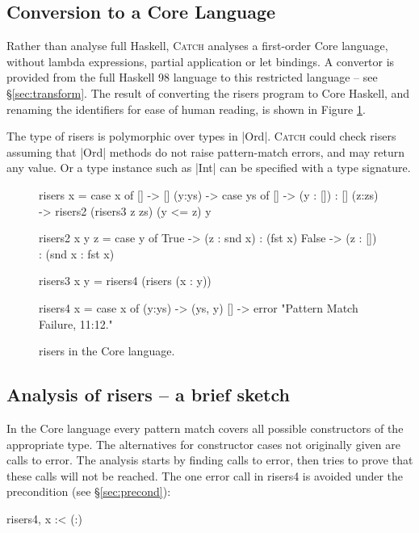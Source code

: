 \documentclass[preprint]{sigplanconf}
\newcommand{\C}[1]{\textsf{#1}}
\newcommand{\catch}{\textsc{Catch}}
\begin{document}
\subsection{Conversion to a Core Language}

Rather than analyse full Haskell, \catch{} analyses a first-order Core language, without lambda expressions, partial application or let bindings. A convertor is provided from the full Haskell 98 language to this restricted language -- see \S\ref{sec:transform}. The result of converting the \C{risers} program to Core Haskell, and renaming the identifiers for ease of human reading, is shown in Figure \ref{fig:risers_core}.

The type of \C{risers} is polymorphic over types in |Ord|. \catch{} could check \C{risers} assuming that |Ord| methods do not raise pattern-match errors, and may return any value. Or a type instance such as |Int| can be specified with a type signature.

\begin{figure}
\begin{code}
risers x = case x of
    [] -> []
    (y:ys) ->  case ys of
         [] -> (y : []) : []
         (z:zs) -> risers2 (risers3 z zs) (y <= z) y

risers2 x y z =  case y of
    True -> (z : snd x) : (fst x)
    False -> (z : []) : (snd x : fst x)

risers3 x y = risers4 (risers (x : y))

risers4 x = case x of
    (y:ys) -> (ys, y)
    [] -> error "Pattern Match Failure, 11:12."
\end{code}
\caption{\C{risers} in the Core language.}
\label{fig:risers_core}
\end{figure}

\subsection{Analysis of \C{risers} -- a brief sketch}

In the Core language every pattern match covers all possible constructors of the appropriate type. The alternatives for constructor cases not originally given are calls to \C{error}. The analysis starts by finding calls to \C{error}, then tries to prove that these calls will not be reached. The one \C{error} call in \C{risers4} is avoided under the precondition (see \S\ref{sec:precond}):

\ignore\begin{code}
risers4, x :< (:)
\end{code}
\end{document}

